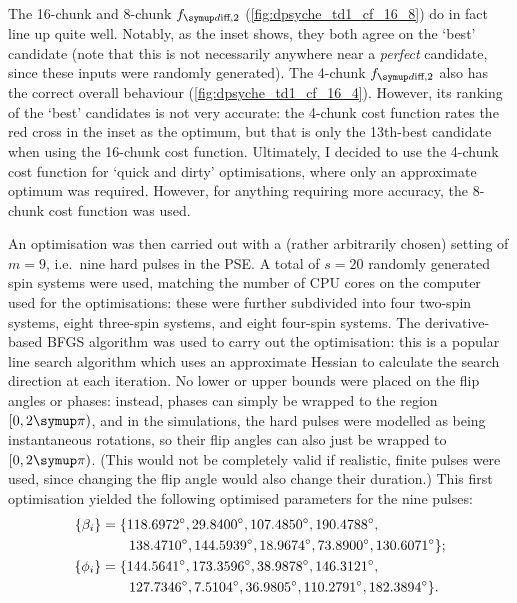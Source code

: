 The 16-chunk and 8-chunk $\fdifftwo$ (\cref{fig:dpsyche_td1_cf_16_8}) do in fact line up quite well.
Notably, as the inset shows, they both agree on the `best' candidate (note that this is not necessarily anywhere near a \textit{perfect} candidate, since these inputs were randomly generated).
The 4-chunk $\fdifftwo$ also has the correct overall behaviour (\cref{fig:dpsyche_td1_cf_16_4}).
However, its ranking of the `best' candidates is not very accurate: the 4-chunk cost function rates the red cross in the inset as the optimum, but that is only the 13th-best candidate when using the 16-chunk cost function.
Ultimately, I decided to use the 4-chunk cost function for `quick and dirty' optimisations, where only an approximate optimum was required.
However, for anything requiring more accuracy, the 8-chunk cost function was used.

An optimisation was then carried out with a (rather arbitrarily chosen) setting of $m = 9$, i.e.\ nine hard pulses in the PSE.
A total of $s = 20$ randomly generated spin systems were used, matching the number of CPU cores on the computer used for the optimisations: these were further subdivided into four two-spin systems, eight three-spin systems, and eight four-spin systems.
The derivative-based BFGS algorithm was used to carry out the optimisation: this is a popular line search algorithm which uses an approximate Hessian to calculate the search direction at each iteration.\autocite{Kelley1999,Nocedal2006}
No lower or upper bounds were placed on the flip angles or phases: instead, phases can simply be wrapped to the region $[0, 2\cpi)$, and in the simulations, the hard pulses were modelled as being instantaneous rotations, so their flip angles can also just be wrapped to $[0, 2\cpi)$.
(This would not be completely valid if realistic, finite pulses were used, since changing the flip angle would also change their duration.)
This first optimisation yielded the following optimised parameters for the nine pulses:
\begin{align}
    \{\beta_i\} &= \{\ang{118.6972}, \ang{29.8400}, \ang{107.4850}, \ang{190.4788}, \notag \\
                &\qquad \ang{138.4710}, \ang{144.5939}, \ang{18.9674}, \ang{73.8900}, \ang{130.6071}\}; \label{eq:dpsyche_opt_nosens_angles} \\
     \{\phi_i\} &= \{\ang{144.5641}, \ang{173.3596}, \ang{38.9878}, \ang{146.3121}, \notag \\
                &\qquad \ang{127.7346}, \ang{7.5104}, \ang{36.9805}, \ang{110.2791}, \ang{182.3894}\}. \label{eq:dpsyche_opt_nosens_phases}
\end{align}

